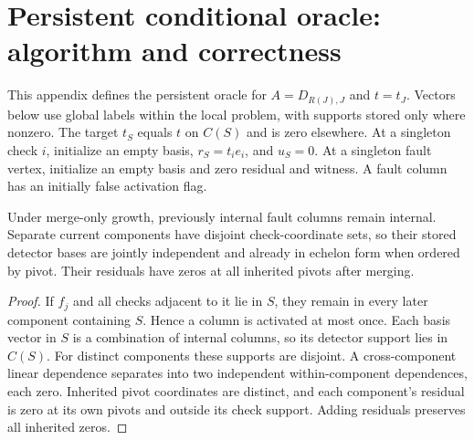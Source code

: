 \section{Persistent conditional oracle: algorithm and correctness}\label{app:persistent}
This appendix defines the persistent oracle for $A=D_{R(J),J}$ and $t=t_J$. Vectors below use global labels within the local problem, with supports stored only where nonzero. The target $t_S$ equals $t$ on $C(S)$ and is zero elsewhere. At a singleton check $i$, initialize an empty basis, $r_S=t_i e_i$, and $u_S=0$. At a singleton fault vertex, initialize an empty basis and zero residual and witness. A fault column has an initially false activation flag.


\begin{lemma}\label{lem:merge}
Under merge-only growth, previously internal fault columns remain internal. Separate current components have disjoint check-coordinate sets, so their stored detector bases are jointly independent and already in echelon form when ordered by pivot. Their residuals have zeros at all inherited pivots after merging.
\end{lemma}
\begin{proof}
If $f_j$ and all checks adjacent to it lie in $S$, they remain in every later component containing $S$. Hence a column is activated at most once. Each basis vector in $S$ is a combination of internal columns, so its detector support lies in $C(S)$. For distinct components these supports are disjoint. A cross-component linear dependence separates into two independent within-component dependences, each zero. Inherited pivot coordinates are distinct, and each component's residual is zero at its own pivots and outside its check support. Adding residuals preserves all inherited zeros.
\end{proof}

